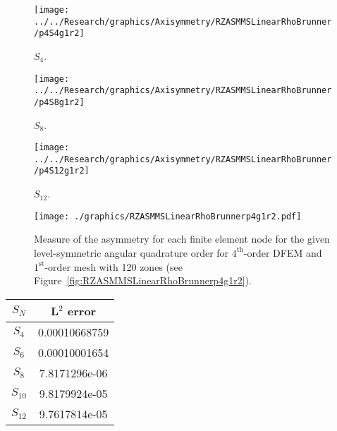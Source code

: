 \documentclass[12pt]{article}
\begin{document}
\begin{sidewaysfigure}[!htb]
\centering
\begin{subfigure}{0.33\textwidth}
\texttt{[image: ../../Research/graphics/Axisymmetry/RZASMMSLinearRhoBrunner/p4S4g1r2]}
\caption{$S_4$.}
\end{subfigure}%
\begin{subfigure}{0.33\textwidth}
\texttt{[image: ../../Research/graphics/Axisymmetry/RZASMMSLinearRhoBrunner/p4S8g1r2]}
\caption{$S_8$.}
\end{subfigure}%
\begin{subfigure}{0.33\textwidth}
\texttt{[image: ../../Research/graphics/Axisymmetry/RZASMMSLinearRhoBrunner/p4S12g1r2]}
\caption{$S_{12}$.}
\end{subfigure}
\caption{Relative asymmetry for $4^\text{st}$-order finite elements on a $1^\text{st}$-order mesh for given order of level-symmetric angular quadrature.}
\label{fig:RZASMMSLinearRhoBrunnerp4g1r2}
\end{sidewaysfigure}

\begin{figure}[!htb]
\centering
\texttt{[image: ./graphics/RZASMMSLinearRhoBrunnerp4g1r2.pdf]}
\caption{Measure of the asymmetry for each finite element node for the given level-symmetric angular quadrature order for $4^\text{th}$-order DFEM and $1^\text{st}$-order mesh with 120 zones (see Figure~\ref{fig:RZASMMSLinearRhoBrunnerp4g1r2}).}
\label{fig:RZASMMSLinearRhoBrunnerp4g1r2Nodes}
\end{figure}

\begin{table}[!htb]
\centering
{\renewcommand{\arraystretch}{1.5}
\begin{tabular}{|c|c|}
\hline
$S_N$ & L$^2$ error \\\hline
$S_4$ & 0.00010668759 \\\hline
$S_6$ & 0.00010001654 \\\hline
$S_8$ & 7.8171296e-06 \\\hline
$S_{10}$ & 9.8179924e-05 \\\hline
$S_{12}$ & 9.7617814e-05 \\\hline
\end{tabular}}
\end{table}
\end{document}
